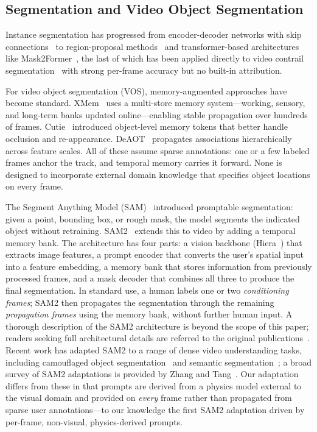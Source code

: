 \documentclass[review]{elsarticle}
\begin{document}
\subsection{Segmentation and Video Object Segmentation}

Instance segmentation has progressed from encoder-decoder networks with skip connections~\cite{ronneberger2015u} to region-proposal methods~\cite{he2017maskrcnn} and transformer-based architectures like Mask2Former~\cite{cheng2021maskformer, cheng2021mask2former_video}, the last of which has been applied directly to video contrail segmentation~\cite{jarry2025gvccs} with strong per-frame accuracy but no built-in attribution.

For video object segmentation (VOS), memory-augmented approaches have become standard. XMem~\cite{cheng2022xmem} uses a multi-store memory system---working, sensory, and long-term banks updated online---enabling stable propagation over hundreds of frames. Cutie~\cite{cheng2024cutie} introduced object-level memory tokens that better handle occlusion and re-appearance. DeAOT~\cite{yang2022deaot} propagates associations hierarchically across feature scales. All of these assume sparse annotations: one or a few labeled frames anchor the track, and temporal memory carries it forward. None is designed to incorporate external domain knowledge that specifies object locations on every frame.

The Segment Anything Model (SAM)~\cite{kirillov2023sam} introduced promptable segmentation: given a point, bounding box, or rough mask, the model segments the indicated object without retraining. SAM2~\cite{ravi2024sam2} extends this to video by adding a temporal memory bank. The architecture has four parts: a vision backbone (Hiera~\cite{ryali2023hiera}) that extracts image features, a prompt encoder that converts the user's spatial input into a feature embedding, a memory bank that stores information from previously processed frames, and a mask decoder that combines all three to produce the final segmentation. In standard use, a human labels one or two \emph{conditioning frames}; SAM2 then propagates the segmentation through the remaining \emph{propagation frames} using the memory bank, without further human input. A thorough description of the SAM2 architecture is beyond the scope of this paper; readers seeking full architectural details are referred to the original publications~\cite{kirillov2023sam, ravi2024sam2}. Recent work has adapted SAM2 to a range of dense video understanding tasks, including camouflaged object segmentation~\cite{zhou2024sam2cos} and semantic segmentation~\cite{hesham2025sam2vss}; a broad survey of SAM2 adaptations is provided by Zhang and Tang~\cite{zhang2025sam2survey}. Our adaptation differs from these in that prompts are derived from a physics model external to the visual domain and provided on \emph{every} frame rather than propagated from sparse user annotations---to our knowledge the first SAM2 adaptation driven by per-frame, non-visual, physics-derived prompts.
\end{document}
